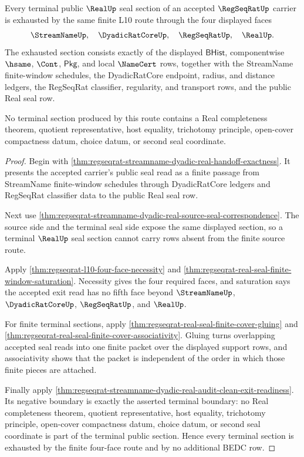 \begin{theorem}
\label{thm:regseqrat-real-seal-terminal-section-exhaustion}
Every terminal public $\RealUp$ seal section of an accepted
$\RegSeqRatUp$ carrier is exhausted by the same finite L10 route through the
four displayed faces
$$
\StreamNameUp,\quad \DyadicRatCoreUp,\quad \RegSeqRatUp,\quad \RealUp.
$$
The exhausted section consists exactly of the displayed $\mathsf{BHist}$,
componentwise $\hsame$, $\Cont$, $\mathsf{Pkg}$, and local $\NameCert$ rows,
together with the StreamName finite-window schedules, the DyadicRatCore
endpoint, radius, and distance ledgers, the RegSeqRat classifier, regularity,
and transport rows, and the public Real seal row.

No terminal section produced by this route contains a Real completeness
theorem, quotient representative, host equality, trichotomy principle,
open-cover compactness datum, choice datum, or second seal coordinate.
\end{theorem}
\begin{proof}
Begin with
\autoref{thm:regseqrat-streamname-dyadic-real-handoff-exactness}. It presents
the accepted carrier's public seal read as a finite passage from StreamName
finite-window schedules through DyadicRatCore ledgers and RegSeqRat classifier
data to the public Real seal row.

Next use
\autoref{thm:regseqrat-streamname-dyadic-real-source-seal-correspondence}. The
source side and the terminal seal side expose the same displayed section, so a
terminal $\RealUp$ seal section cannot carry rows absent from the finite source
route.

Apply \autoref{thm:regseqrat-l10-four-face-necessity} and
\autoref{thm:regseqrat-real-seal-finite-window-saturation}. Necessity gives the
four required faces, and saturation says the accepted exit read has no fifth
face beyond $\StreamNameUp$, $\DyadicRatCoreUp$, $\RegSeqRatUp$, and
$\RealUp$.

For finite terminal sections, apply
\autoref{thm:regseqrat-real-seal-finite-cover-gluing} and
\autoref{thm:regseqrat-real-seal-finite-cover-associativity}. Gluing turns
overlapping accepted seal reads into one finite packet over the displayed
support rows, and associativity shows that the packet is independent of the
order in which those finite pieces are attached.

Finally apply
\autoref{thm:regseqrat-streamname-dyadic-real-audit-clean-exit-readiness}. Its
negative boundary is exactly the asserted terminal boundary: no Real
completeness theorem, quotient representative, host equality, trichotomy
principle, open-cover compactness datum, choice datum, or second seal
coordinate is part of the terminal public section. Hence every terminal section
is exhausted by the finite four-face route and by no additional BEDC row.
\end{proof}

